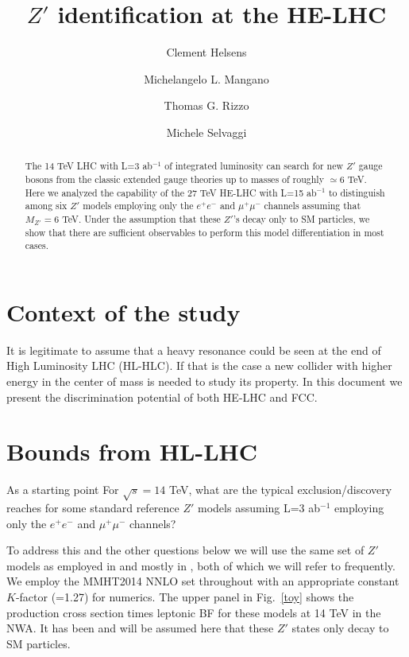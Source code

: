 \documentclass[14pt]{article}
\author[1]{Clement Helsens}
\author[2]{Michelangelo L. Mangano}
\author[3]{Thomas G. Rizzo}
\author[1]{Michele Selvaggi}
\affil[1]{CERN EP-Departement, CH-1211 Geneva 23, Switzerland}
\affil[2]{CERN TH-Departement, CH-1211 Geneva 23, Switzerland}
\affil[3]{SLAC National Accelerator Laboratory 2575 Sand Hill Rd., Menlo Park, CA, 94025 USA}
\title{$Z'$ identification at the HE-LHC}
\begin{document}
\maketitle
\tableofcontents


\begin{abstract}
 
\noindent

The 14 TeV LHC with L=3 ab$^{-1}$ of integrated luminosity can search for new $Z'$ gauge bosons from the classic extended gauge theories up to masses 
of roughly $\simeq 6$ TeV.  Here we analyzed the capability of the 27 TeV HE-LHC with L=15 ab$^{-1}$ to distinguish among six $Z'$ models employing only 
the $e^+e^-$ and $\mu^+\mu^-$ channels assuming that $M_{Z'}=6$ TeV. Under the assumption that these $Z'$'s decay only to SM particles,  we show that 
there are sufficient observables to perform this model differentiation in most cases. 
\end{abstract}



\section{Context of the study}
It is legitimate to assume that a heavy resonance could be seen at the end of High Luminosity LHC (HL-HLC). If that is the case a new collider with higher energy 
in the center of mass is needed to study its property. In this document we present the discrimination potential of both HE-LHC and FCC.


\section{Bounds from HL-LHC}
As a starting point For $\sqrt s=14$ TeV, what are the typical exclusion/discovery reaches for some standard reference $Z'$ models assuming L=3 ab$^{-1}$ 
employing only the $e^+e^-$ and $\mu^+\mu^-$ channels? 

To address this and the other questions below we will use the same set of $Z'$ models as employed in \cite{Rizzo:2014xma} and mostly in \cite{Han:2013mra}, both of 
which we will refer to frequently. We employ the MMHT2014 NNLO set \cite{Harland-Lang:2014zoa} throughout with an appropriate constant $K$-factor (=1.27) for numerics. 
The upper panel in Fig.~\ref{toy} shows the production cross section times leptonic BF for these models at 14 TeV in the NWA. It has 
been and will be assumed here that these $Z'$ states only decay to SM particles. 
\end{document}
